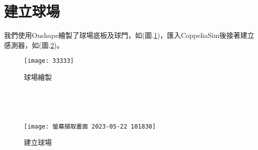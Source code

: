 \section{建立球場}
我們使用Onshape繪製了球場底板及球門，如(圖.\ref{球場繪製})，匯入CoppeliaSim後接著建立感測器，如(圖.\ref{建立球場})。\
\begin{figure}[hbt!]
\begin{center}
\texttt{[image: 33333]}
\caption{\Large 球場繪製}\label{球場繪製}
\end{center}
\end{figure}\
\begin{figure}[hbt!]
\begin{center}
\end{center}
\end{figure}\
\begin{figure}[hbt!]
\begin{center}
\texttt{[image: 螢幕擷取畫面 2023-05-22 101830]}
\caption{\Large 建立球場}\label{建立球場}
\end{center}
\end{figure}\
\newpage

